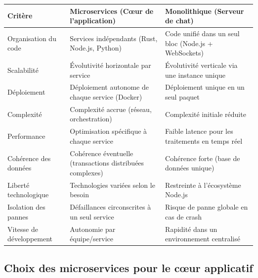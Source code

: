 \documentclass{rapportPfe}
\begin{document}
\begin{center}
\begin{tabular}{|p{4cm}|p{5.5cm}|p{5.5cm}|}
\hline
\textbf{Critère} & \textbf{Microservices (Cœur de l'application)} & \textbf{Monolithique (Serveur de chat)} \\
\hline
Organisation du code & Services indépendants (Rust, Node.js, Python) & Code unifié dans un seul bloc (Node.js + WebSockets) \\
\hline
Scalabilité & Évolutivité horizontale par service & Évolutivité verticale via une instance unique \\
\hline
Déploiement & Déploiement autonome de chaque service (Docker) & Déploiement unique en un seul paquet \\
\hline
Complexité & Complexité accrue (réseau, orchestration) & Complexité initiale réduite \\
\hline
Performance & Optimisation spécifique à chaque service & Faible latence pour les traitements en temps réel \\
\hline
Cohérence des données & Cohérence éventuelle (transactions distribuées complexes) & Cohérence forte (base de données unique) \\
\hline
Liberté technologique & Technologies variées selon le besoin & Restreinte à l’écosystème Node.js \\
\hline
Isolation des pannes & Défaillances circonscrites à un seul service & Risque de panne globale en cas de crash \\
\hline
Vitesse de développement & Autonomie par équipe/service & Rapidité dans un environnement centralisé \\
\hline
\end{tabular}
\end{center}

\subsection{Choix des microservices pour le cœur applicatif}
\end{document}
